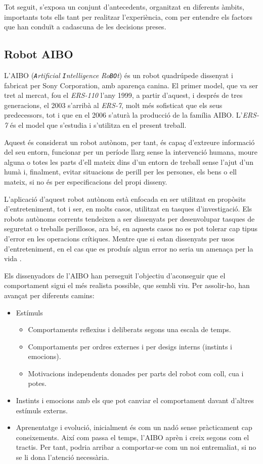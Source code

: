 \documentclass[12pt,a4paper,final,twoside]{report}
\begin{document}
Tot seguit, s'exposa un conjunt d'antecedents, organitzat en diferents àmbits, importants tots ells tant per realitzar l'experiència, com per entendre els factors que han conduït a cadascuna de les decisions preses.


\subsection{Robot AIBO}
\label{AIBO}

L'AIBO (\textit{\texttt{A}rtificial \texttt{I}ntelligence Ro\texttt{BO}t}) és un robot quadrúpede dissenyat i fabricat per Sony Corporation, amb aparença canina. El primer model, que va ser tret al mercat, fou el \textit{ERS-110} l'any 1999, a partir d'aquest, i després de tres generacions, el 2003 s'arribà al \textit{ERS-7}, molt més sofisticat que els seus predecessors, tot i que en el 2006 s'aturà la producció de la família AIBO. L'\textit{ERS-7} és el model que s'estudia i s'utilitza en el present treball.

Aquest és considerat un robot autònom, per tant, és capaç d'extreure informació del seu entorn, funcionar per un període llarg sense la intervenció humana, moure alguna o totes les parts d'ell mateix dins d'un entorn de treball sense l'ajut d'un humà i, finalment, evitar situacions de perill per les persones, els bens o ell mateix, si no és per especificacions del propi disseny.

L'aplicació d'aquest robot autònom està enfocada en ser utilitzat en propòsits d'entreteniment, tot i ser, en molts casos, utilitzat en tasques d'investigació. Els robots autònoms corrents tendeixen a ser dissenyats per desenvolupar tasques de seguretat o treballs perillosos, ara bé, en aquests casos no es pot tolerar cap tipus d'error en les operacions crítiques. Mentre que si estan dissenyats per usos d'entreteniment, en el cas que es produís algun error no seria un amenaça per la vida \cite{Fujita2000}.

Els dissenyadors de l'AIBO han perseguit l'objectiu d'aconseguir que el comportament sigui el més realista possible, que sembli viu. Per assolir-ho, han avançat per diferents camins:
\begin{itemize}
\item Estímuls
\begin{itemize}
\item Comportaments reflexius i deliberats segons una escala de temps.
\item Comportaments per ordres externes i per desigs interns (instints i emocions).
\item Motivacions independents donades per parts del robot com coll, cua i potes.
\end{itemize}
\item Instints i emocions amb els que pot canviar el comportament davant d'altres estímuls externs.
\item Aprenentatge i evolució, inicialment és com un nadó sense pràcticament cap coneixements. Així com passa el temps, l'AIBO aprèn i creix segons com el tractis. Per tant, podria arribar a comportar-se com un noi entremaliat, si no se li dona l'atenció necessària.
\end{itemize}
\end{document}
